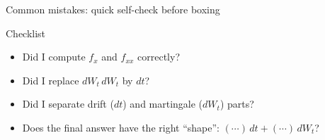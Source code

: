 \documentclass[10pt,aspectratio=169]{beamer}
\begin{document}
\begin{frame}{Common mistakes: quick self-check before boxing}

\begin{block}{Checklist}
\begin{itemize}
  \item Did I compute $f_x$ and $f_{xx}$ correctly?\pause
  \item Did I replace $dW_t\,dW_t$ by $dt$?\pause
  \item Did I separate drift ($dt$) and martingale ($dW_t$) parts?\pause
  \item Does the final answer have the right “shape”: $(\cdots)\,dt+(\cdots)\,dW_t$?
\end{itemize}
\end{block}

\end{frame}
\end{document}
